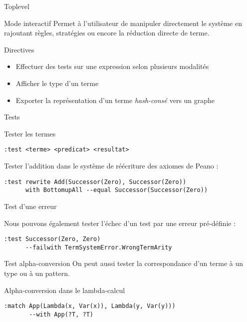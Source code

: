 \begin{frame}{Toplevel}

\begin{block}{Mode interactif}
Permet à l'utilisateur de manipuler directement le système en rajoutant règles,
stratégies ou encore la réduction directe de terme.
\end{block}

\begin{block}{Directives}
\begin{itemize}
\item Effectuer des tests sur une expression selon plusieurs modalités
\item Afficher le type d'un terme
\item Exporter la représentation d'un terme \emph{hash-consé} vers un graphe
\end{itemize}
\end{block}

\end{frame}

\begin{frame}[fragile]{Tests}

\begin{block}{Tester les termes}
\begin{verbatim} 
:test <terme> <predicat> <resultat> 
\end{verbatim}
\end{block}

Tester l'addition dans le système de réécriture des axiomes de Peano :
\begin{verbatim}
:test rewrite Add(Successor(Zero), Successor(Zero)) 
      with BottomupAll --equal Successor(Successor(Zero))
\end{verbatim}

\end{frame}

\begin{frame}[fragile]{Test d'une erreur}

Nous pouvons également tester l'échec d'un test par une erreur pré-définie :
\medskip

\begin{verbatim}
:test Successor(Zero, Zero) 
      --failwith TermSystemError.WrongTermArity
\end{verbatim}

\end{frame}

\begin{frame}[fragile]{Test alpha-conversion}
  On peut aussi tester la correspondance d'un terme à un type ou à un
  pattern.

\begin{block}{Alpha-conversion dans le lambda-calcul}
\begin{verbatim}
:match App(Lambda(x, Var(x)), Lambda(y, Var(y))) 
       --with App(?T, ?T) 
\end{verbatim}
\end{block}

\end{frame}

